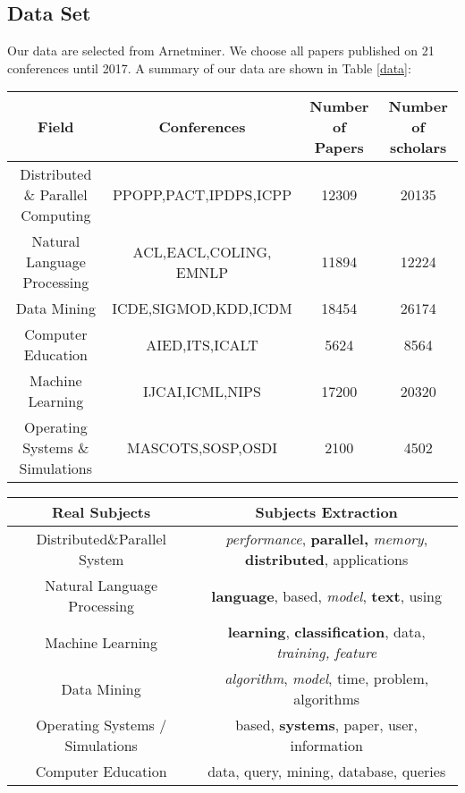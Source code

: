 \documentclass[conference]{IEEEtran}
\begin{document}
\subsection{Data Set}
Our data are selected from Arnetminer\cite{tang2008arnetminer}. We choose all papers published on 21 conferences until 2017. A summary of our data are shown in Table \ref{data}:
\begin{table*}[h]
\center
	\begin{tabular}{c|c|c|c}
	\hline
	\hline
	\textbf{Field} & \textbf{Conferences} & \textbf{Number of Papers}&\textbf{Number of scholars}\\
	\hline
	\hline
	Distributed \& Parallel Computing & PPOPP,PACT,IPDPS,ICPP & 12309&20135\\
	\hline
	Natural Language Processing & ACL,EACL,COLING, EMNLP &11894&12224\\
	\hline
	Data Mining & ICDE,SIGMOD,KDD,ICDM&18454&26174\\
	\hline
	Computer Education & AIED,ITS,ICALT&5624&8564\\
	\hline
	Machine Learning &IJCAI,ICML,NIPS&17200
&20320\\
	\hline
	Operating Systems \& Simulations & MASCOTS,SOSP,OSDI&2100&4502\\
	\hline
	\hline
	\end{tabular}
	\caption{A summary of data.}
	\label{data}
\end{table*}
\begin{table*}[h]
\center
	\begin{tabular}{c|c}	
	\hline
	\hline
  Real Subjects & Subjects Extraction\\
  \hline
  \hline
    Distributed\&Parallel System & \emph{performance}, \textbf{parallel,}
  \emph{memory}, \textbf{distributed}, applications\\
  \hline
  Natural Language Processing & \textbf{language}, based, \emph{model},
  \textbf{text}, using\\
  \hline
  Machine Learning & \textbf{learning}, \textbf{classification}, data,
  \emph{training, feature}\\
  \hline
  Data Mining & \emph{algorithm}, \emph{model}, time, problem,
  algorithms\\
  \hline
  Operating Systems / Simulations & based, \textbf{systems}, paper,
  user, information\\
  \hline
  Computer Education & data, query, mining, database,
  queries\\
  \hline
  \hline
  \end{tabular}
  
 \caption{The Subject Extraction using LDA model.}
 \label{LDA}
  \end{table*}
\end{document}

